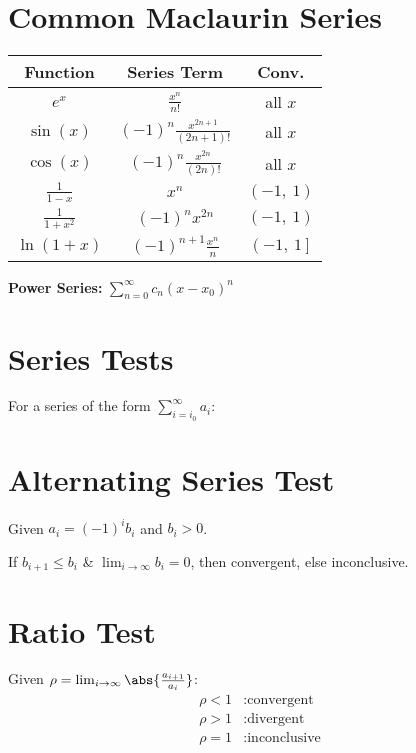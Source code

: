 \documentclass{article}
\begin{document}
\begin{multicols}{3}
    \section*{Common Maclaurin Series}
    \begin{table}[H]
        \centering
        \begin{tabular}{c c c}
            \toprule
            \textbf{Function}           & \textbf{Series Term}                                          & \textbf{Conv.}             \\
            \midrule
            \(e^{x}\)                   & \(\frac{x^n}{n!}\)                                            & all \(x\)                  \\
            \(\sin{\left( x \right)}\)  & \(\left( -1 \right)^n \frac{x^{2n+1}}{\left( 2n+1 \right)!}\) & all \(x\)                  \\
            \(\cos{\left( x \right)}\)  & \(\left( -1 \right)^n \frac{x^{2n}}{\left( 2n \right)!}\)     & all \(x\)                  \\
            \(\frac{1}{1-x}\)           & \(x^n\)                                                       & \(\left( -1,\: 1 \right)\) \\
            \(\frac{1}{1+x^2}\)         & \(\left( -1 \right)^n x^{2n}\)                                & \(\left( -1,\: 1 \right)\) \\
            \(\ln{\left( 1+x \right)}\) & \(\left( -1 \right)^{n+1} \frac{x^n}{n}\)                     & \(\left( -1,\: 1 \right]\) \\ %
            \bottomrule
        \end{tabular}
    \end{table}
    \textbf{Power Series:} \(\sum_{n=0}^{\infty} c_n\left( x-x_0 \right)^n\)
    \section*{Series Tests}
    For a series of the form \(\displaystyle\sum_{i=i_0}^\infty a_i\):
    \section*{Alternating Series Test}
    Given \(a_i = \left( -1 \right)^i b_i\) and \(b_i>0\).

    If \(b_{i+1}\leqslant b_i\) \& \(\lim_{i\to\infty}b_i=0\), then
    convergent, else inconclusive. \section*{Ratio Test} Given \(\rho =
    \lim_{i\to\infty}\abs{\frac{a_{i+1}}{a_i}}\):
    \begin{align*}
        \rho < 1 & : \text{convergent}   \\
        \rho > 1 & : \text{divergent}    \\
        \rho = 1 & : \text{inconclusive}
    \end{align*}

\end{multicols}
\end{document}
